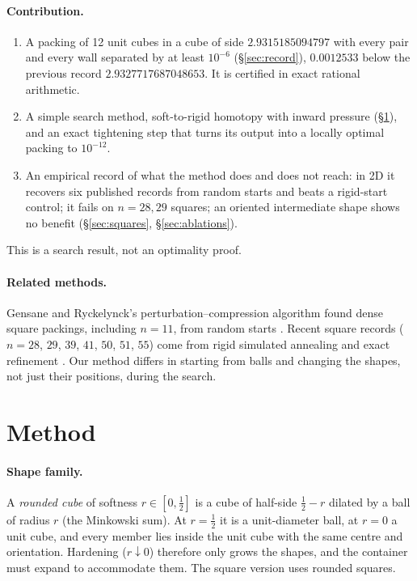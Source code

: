 \documentclass[11pt]{article}
\begin{document}
\paragraph{Contribution.}
\begin{enumerate}
\item A packing of 12 unit cubes in a cube of side $2.9315185094797$ with every pair and every wall separated by at least $10^{-6}$ (\S\ref{sec:record}), $0.0012533$ below the previous record $2.9327717687048653$. It is certified in exact rational arithmetic.
\item A simple search method, soft-to-rigid homotopy with inward pressure (\S\ref{sec:method}), and an exact tightening step that turns its output into a locally optimal packing to $10^{-12}$.
\item An empirical record of what the method does and does not reach: in 2D it recovers six published records from random starts and beats a rigid-start control; it fails on $n=28,29$ squares; an oriented intermediate shape shows no benefit (\S\ref{sec:squares}, \S\ref{sec:ablations}).
\end{enumerate}
This is a search result, not an optimality proof.

\paragraph{Related methods.} Gensane and Ryckelynck's perturbation--compression algorithm found dense square packings, including $n=11$, from random starts \cite{gensane}. Recent square records ($n=28$, $29$, $39$, $41$, $50$, $51$, $55$) come from rigid simulated annealing and exact refinement \cite{squaresproject}. Our method differs in starting from balls and changing the shapes, not just their positions, during the search.

\section{Method}\label{sec:method}
\paragraph{Shape family.} A \emph{rounded cube} of softness $r\in[0,\tfrac12]$ is a cube of half-side $\tfrac12-r$ dilated by a ball of radius $r$ (the Minkowski sum). At $r=\tfrac12$ it is a unit-diameter ball, at $r=0$ a unit cube, and every member lies inside the unit cube with the same centre and orientation. Hardening ($r\downarrow 0$) therefore only grows the shapes, and the container must expand to accommodate them. The square version uses rounded squares.
\end{document}
